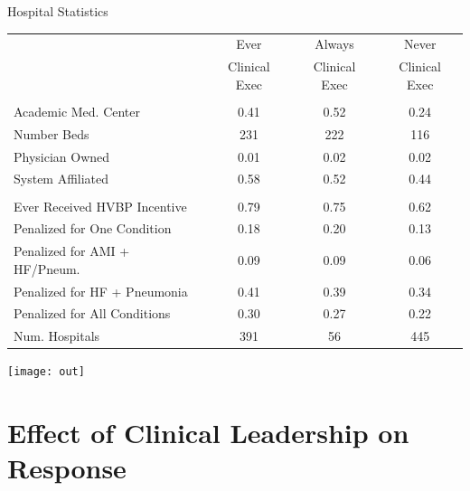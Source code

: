 \documentclass[notes,11pt, aspectratio=169]{beamer}
\begin{document}
\begin{frame}{Hospital Statistics}
\vspace{-2mm}
    \begin{table}[ht!]
    \centering
    \begin{tabular}[t]{lccc}
     & Ever & Always & Never\\
      & Clinical Exec & Clinical Exec & Clinical Exec\\
    \midrule
    \addlinespace[0.3em]
    \multicolumn{4}{l}{\textbf{Hospital Characteristics}}\\
    \hspace{1em}Academic Med. Center & 0.41 & 0.52 & 0.24\\
    \hspace{1em}Number Beds & 231 & 222 & 116\\
    \hspace{1em}Physician Owned & 0.01 & 0.02 & 0.02\\
    \hspace{1em}System Affiliated & 0.58 & 0.52 & 0.44\\
    \addlinespace[0.3em]
    \multicolumn{4}{l}{\textbf{Penalty/Payment Variables}}\\
    \hspace{1em}Ever Received HVBP Incentive & 0.79 & 0.75 & 0.62\\
    \hspace{1em}Penalized for One Condition & 0.18 & 0.20 & 0.13\\
    \hspace{1em}Penalized for AMI + HF/Pneum. & 0.09 & 0.09 & 0.06\\
    \hspace{1em}Penalized for HF + Pneumonia & 0.41 & 0.39 & 0.34\\
    \hspace{1em}Penalized for All Conditions & 0.30 & 0.27 & 0.22\\
    Num. Hospitals & 391 & 56 & 445\\
    \bottomrule
    \end{tabular}
    \end{table}
\end{frame}

\begin{frame}{}
    \texttt{[image: out]}
\end{frame}


\section{Effect of Clinical Leadership on Response}
\end{document}
